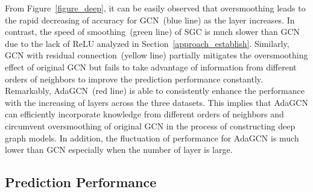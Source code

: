\documentclass{article} \usepackage{iclr2021_conference,times}
\begin{document}
From Figure~\ref{figure_deep}, it can be easily observed that oversmoothing leads to the rapid decreasing of accuracy for GCN~(blue line) as the layer increases. In contrast, the speed of smoothing~(green line) of SGC is much slower than GCN due to the lack of ReLU analyzed in Section~\ref{approach_establish}. Similarly, GCN with residual connection~(yellow line) partially mitigates the oversmoothing effect of original GCN but fails to take advantage of information from different orders of neighbors to improve the prediction performance constantly. Remarkably, AdaGCN~(red line) is able to consistently enhance the performance with the increasing of layers across the three datasets. This implies that AdaGCN can efficiently incorporate knowledge from different orders of neighbors and circumvent oversmoothing of original GCN in the process of constructing deep graph models. In addition, the fluctuation of performance for AdaGCN is much lower than GCN especially when the number of layer is large.



\begin{table}[t!]
	\centering
	\caption{Average accuracy across different label rates with 20 splittings of datasets under 100 runs.}
	\label{table_labelrate}
\end{table}

\subsection{Prediction Performance}\label{experiment_performance}
\end{document}
